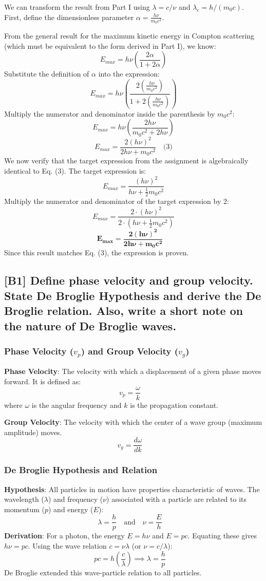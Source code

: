 \documentclass[12pt]{article}
\begin{document}
We can transform the result from Part I using $\lambda = c/\nu$ and $\lambda_e = h/(m_0c)$.
First, define the dimensionless parameter $\alpha = \frac{h\nu}{m_0c^2}$.

From the general result for the maximum kinetic energy in Compton scattering (which must be equivalent to the form derived in Part I), we know:
$$
E_{max} = h\nu \left( \frac{2\alpha}{1+2\alpha} \right)
$$
Substitute the definition of $\alpha$ into the expression:
$$
E_{max} = h\nu \left( \frac{2 \left(\frac{h\nu}{m_0c^2}\right)}{1 + 2 \left(\frac{h\nu}{m_0c^2}\right)} \right)
$$
Multiply the numerator and denominator inside the parenthesis by $m_0c^2$:
$$
E_{max} = h\nu \left( \frac{2h\nu}{m_0c^2 + 2h\nu} \right)
$$
$$
E_{max} = \frac{2(h\nu)^2}{2h\nu + m_0c^2} \quad \text{(3)}
$$
We now verify that the target expression from the assignment is algebraically identical to Eq. (3). The target expression is:
$$
E_{max} = \frac{(h\nu)^2}{h\nu+ \frac{1}{2} m_0c^2}
$$
Multiply the numerator and denominator of the target expression by 2:
$$
E_{max} = \frac{2 \cdot (h\nu)^2}{2 \cdot \left(h\nu+ \frac{1}{2} m_0c^2\right)}
$$
$$
\mathbf{E_{max} = \frac{2(h\nu)^2}{2h\nu + m_0c^2}} \quad \text{}
$$
Since this result matches Eq. (3), the expression is proven.

\subsection{[B1] Define phase velocity and group velocity. State De Broglie Hypothesis and derive the De Broglie relation. Also, write a short note on the nature of De Broglie waves.}

\subsubsection*{Phase Velocity ($v_p$) and Group Velocity ($v_g$)}
\textbf{Phase Velocity}: The velocity with which a displacement of a given phase moves forward. It is defined as:
$$
v_p = \frac{\omega}{k} \quad \text{}
$$
where $\omega$ is the angular frequency and $k$ is the propagation constant.

\textbf{Group Velocity}: The velocity with which the center of a wave group (maximum amplitude) moves.
$$
v_g = \frac{d\omega}{dk} \quad \text{}
$$

\subsubsection*{De Broglie Hypothesis and Relation}
\textbf{Hypothesis}: All particles in motion have properties characteristic of waves. The wavelength ($\lambda$) and frequency ($\nu$) associated with a particle are related to its momentum ($p$) and energy ($E$):
$$
\lambda = \frac{h}{p} \quad \text{and} \quad \nu = \frac{E}{h} \quad \text{}
$$
\textbf{Derivation}: For a photon, the energy $E = h\nu$ and $E=pc$. Equating these gives $h\nu = pc$. Using the wave relation $c = \nu\lambda$ (or $\nu = c/\lambda$):
$$
p c = h \left(\frac{c}{\lambda}\right) \implies \lambda = \frac{h}{p} \quad \text{}
$$
De Broglie extended this wave-particle relation to all particles.
\end{document}
